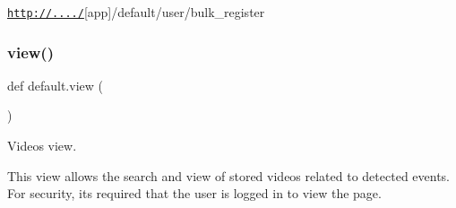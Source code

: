 \href{http://..../}{\tt http\+://..../}\mbox{[}app\mbox{]}/default/user/bulk\+\_\+register \mbox{\label{namespacedefault_a2bed257028509c3e94a4db8fdada8d1e}} 
\subsubsection{\texorpdfstring{view()}{view()}}
{\footnotesize\ttfamily def default.\+view (\begin{DoxyParamCaption}{ }\end{DoxyParamCaption})}



Videos view. 

This view allows the search and view of stored videos related to detected events. For security, it\textquotesingle{}s required that the user is logged in to view the page. 